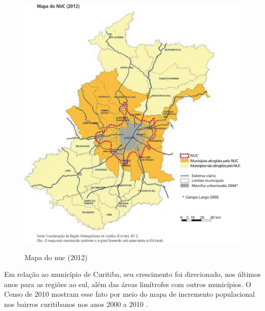 	\begin{figure}
		\centering
		\caption{Mapa do \gls{nuc} (2012)}
		\includegraphics[width=1.0\linewidth]{img/costa2015a_03}
		\label{fig:costa2015a_03}
	\end{figure}
    
	Em relação ao município de Curitiba, seu crescimento foi direcionado, nos últimos anos para as regiões ao sul, além das áreas limítrofes com outros municípios. O Censo de 2010 mostram esse fato por meio do mapa de incremento populacional nos bairros curitibanos nos anos 2000 a 2010 \cite[p. 11]{costa2015a}.
    
